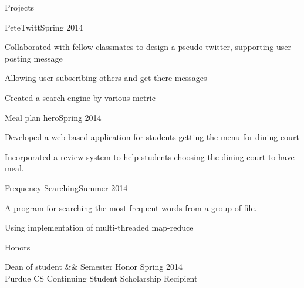 \documentclass{resume} %
\begin{document}
\begin{rSection}{Projects}
\begin{rSubsection}{PeteTwitt}{Spring 2014}{}{}
\item Collaborated with fellow classmates to design a pseudo-twitter, supporting user posting message
\item Allowing user subscribing others and get there messages
\item Created a search engine by various metric
\end{rSubsection}

\begin{rSubsection}{Meal plan hero}{Spring 2014}{}{}
\item Developed a web based application for students getting the menu for dining court
\item Incorporated a review system to help students choosing the dining court to have meal.
\end{rSubsection}

\begin{rSubsection}{Frequency Searching}{Summer 2014}{}{}
\item A program for searching the most frequent words from a group of file.
\item Using implementation of multi-threaded map-reduce
\end{rSubsection}


\end{rSection}

\begin{rSection}{Honors}{}{}


Dean of student \&\& Semester Honor  \hspace{100mm} Spring 2014\\ 
Purdue CS Continuing Student Scholarship Recipient 


\end{rSection}

\end{document}

